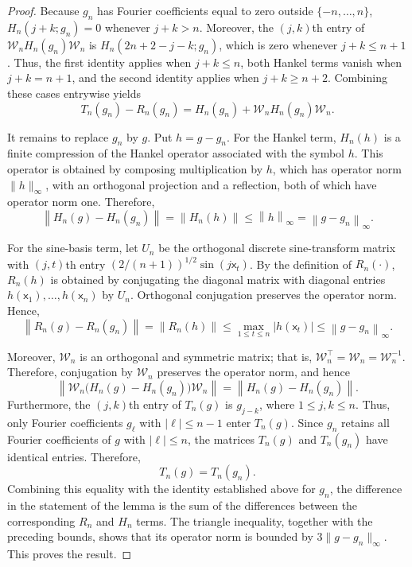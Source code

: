 \documentclass[10pt,a4paper]{amsart}
\newcommand{\sfx}{\mathsf{x}}
\begin{document}
\begin{proof}
Because \(g_n\) has Fourier coefficients equal to zero outside \(\{-n,\ldots,n\}\), \(H_n(j+k;g_n)=0\) whenever \(j+k>n\). Moreover, the \((j,k)\)th entry of \(\mathcal{W}_nH_n(g_n)\mathcal{W}_n\) is \(H_n(2n+2-j-k;g_n)\), which is zero whenever \(j+k\leq n+1\). Thus, the first identity applies when \(j+k\leq n\), both Hankel terms vanish when \(j+k=n+1\), and the second identity applies when \(j+k\geq n+2\). Combining these cases entrywise yields
\begin{equation*}
T_n(g_n)-R_n(g_n)
=
H_n(g_n)+\mathcal{W}_nH_n(g_n)\mathcal{W}_n.
\end{equation*}

It remains to replace \(g_n\) by \(g\). Put \(h=g-g_n\). For the Hankel term, \(H_n(h)\) is a finite compression of the Hankel operator associated with the symbol \(h\). This operator is obtained by composing multiplication by \(h\), which has operator norm \(\|h\|_\infty\), with an orthogonal projection and a reflection, both of which have operator norm one. Therefore,
\begin{equation*}
\left\|H_n(g)-H_n(g_n)\right\|
=
\left\|H_n(h)\right\|
\leq
\left\|h\right\|_\infty
=
\left\|g-g_n\right\|_\infty.
\end{equation*}

For the sine-basis term, let \(U_n\) be the orthogonal discrete sine-transform matrix with \((j,t)\)th entry \((2/(n+1))^{1/2}\sin(j\sfx_t)\). By the definition of \(R_n(\cdot)\), \(R_n(h)\) is obtained by conjugating the diagonal matrix with diagonal entries \(h(\sfx_1),\ldots,h(\sfx_n)\) by \(U_n\). Orthogonal conjugation preserves the operator norm. Hence,
\begin{equation*}
\left\|R_n(g)-R_n(g_n)\right\|
=
\left\|R_n(h)\right\|
\leq
\max_{1\leq t\leq n}|h(\sfx_t)|
\leq
\left\|g-g_n\right\|_\infty.
\end{equation*}

Moreover, \(\mathcal{W}_n\) is an orthogonal and symmetric matrix; that is, \(\mathcal{W}_n^\top=\mathcal{W}_n=\mathcal{W}_n^{-1}\). Therefore, conjugation by \(\mathcal{W}_n\) preserves the operator norm, and hence
\begin{equation*}
\left\|
\mathcal{W}_n
\bigl (H_n(g)-H_n(g_n)\bigr)
\mathcal{W}_n
\right\|
=
\left\|
H_n(g)-H_n(g_n)
\right\|.
\end{equation*}
Furthermore, the \((j,k)\)th entry of \(T_n(g)\) is \(g_{j-k}\), where \(1\leq j,k\leq n\). Thus, only Fourier coefficients \(g_\ell\) with \(|\ell|\leq n-1\) enter \(T_n(g)\). Since \(g_n\) retains all Fourier coefficients of \(g\) with \(|\ell|\leq n\), the matrices \(T_n(g)\) and \(T_n(g_n)\) have identical entries. Therefore,
\begin{equation*}
T_n(g)=T_n(g_n).
\end{equation*}
Combining this equality with the identity established above for \(g_n\), the difference in the statement of the lemma is the sum of the differences between the corresponding \(R_n\) and \(H_n\) terms. The triangle inequality, together with the preceding bounds, shows that its operator norm is bounded by \(3\|g-g_n\|_\infty\). This proves the result.
\end{proof}
\end{document}
